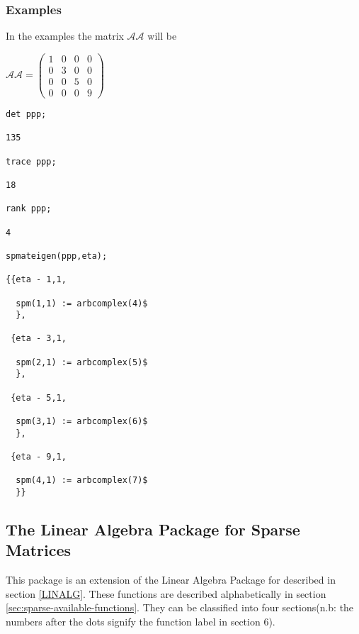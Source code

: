 \subsubsection{Examples}
In the examples the matrix $\mathcal{AA}$ will be 

\begin{flushleft}
\begin{math}
\mathcal{AA} = \left( \begin{array}{cccc} 1 & 0 & 0 & 0 \\ 0 & 3 & 0 & 0 \\ 
0 & 0 & 5 & 0 \\ 0 & 0 & 0 & 9
\end{array} \right)
\end{math}
\end{flushleft}
\begin {verbatim}
det ppp;

135

trace ppp;

18

rank ppp;

4

spmateigen(ppp,eta);

{{eta - 1,1,

  spm(1,1) := arbcomplex(4)$
  },

 {eta - 3,1,

  spm(2,1) := arbcomplex(5)$
  },

 {eta - 5,1,

  spm(3,1) := arbcomplex(6)$
  },

 {eta - 9,1,

  spm(4,1) := arbcomplex(7)$
  }}
\end{verbatim}

\subsection{The Linear Algebra Package for Sparse Matrices}
This package is an extension of the Linear Algebra Package for \REDUCE{}
described in section \ref{LINALG}.
These functions are described 
alphabetically in section \ref{sec:sparse-available-functions}.
They can be classified into four sections(n.b: the numbers after 
the dots signify the function label in section 6).
